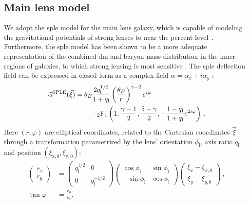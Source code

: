 \subsection{Main lens model}\label{subsec:sl-model-lens}

    
We adopt the \gls*{sple} model for the main lens galaxy, which is capable of modeling the gravitational potentials of strong lenses to near the percent level~\cite{Suyu:2008zp}. Furthermore, the \gls*{sple} model has been shown to be a more adequate representation of the combined \gls*{dm} and baryon mass distribution in the inner regions of galaxies, to which strong lensing is most sensitive \cite{Suyu:2008zp}. The \gls*{sple} deflection field can be expressed in closed-form as a complex field $\alpha = \alpha_x + i \alpha_y$ \cite{Tessore:2015baa,ORiordan:2020aa}:
\begin{equation}
\begin{split}
    \vec{\alpha}^\mathrm{SPLE}(\vec{\xi}) = \theta_E & \frac{2 q_\mathrm{l}^{1/2}}{1 + q_\mathrm{l}} \left( \frac{\theta_E}{r} \right)^{\gamma - 2} e^{i \varphi} \\
    & \cdot {}_2\mathrm{F}_1\left( 1, \frac{\gamma - 1}{2}, \frac{5 - \gamma}{2}, -\frac{1-q_\mathrm{l}}{1+q_\mathrm{l}} e^{2 i \varphi} \right) \, .
\end{split}
\end{equation}
Here $(r, \varphi)$ are elliptical coordinates, related to the Cartesian coordinates $\vec{\xi}$ through a transformation parametrized by the lens' orientation $\phi_\mathrm{l}$, axis ratio $q_\mathrm{l}$ and position $(\xi_\mathrm{x, 0}, \xi_\mathrm{y, 0})$:
\begin{align}
    \begin{pmatrix} r_x \\ r_y \end{pmatrix} &= \begin{pmatrix} q_\mathrm{l}^{1/2} & 0 \\ 0 & q_\mathrm{l}^{-1/2} \end{pmatrix} \begin{pmatrix} \cos\phi_\mathrm{l} & \sin\phi_\mathrm{l} \\ -\sin\phi_\mathrm{l} & \cos\phi_\mathrm{l} \end{pmatrix} \begin{pmatrix} \xi_x - \xi_{x, 0} \\ \xi_y - \xi_{y, 0} \end{pmatrix} \, ,\\
    \tan \varphi &= \frac{r_y}{r_x}.
\end{align}

